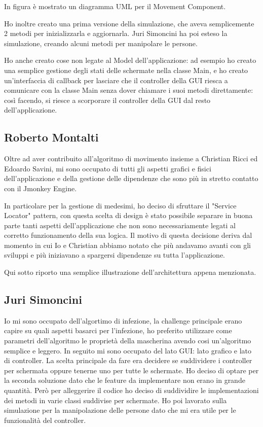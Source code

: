 In figura è mostrato un diagramma UML per il Movement Component.

Ho inoltre creato una prima versione della simulazione, che aveva semplicemente 2 metodi per inizializzarla e aggiornarla. Juri Simoncini ha poi esteso la simulazione, creando alcuni metodi per manipolare le persone.

Ho anche creato cose non legate al Model dell'applicazione: ad esempio ho creato una semplice gestione degli stati delle schermate nella classe Main, e ho creato un'interfaccia di callback per lasciare che il controller della GUI riesca a comunicare con la classe Main senza dover chiamare i suoi metodi direttamente: così facendo, si riesce a scorporare il controller della GUI dal resto dell'applicazione.

\subsection{Roberto Montalti}

Oltre ad aver contribuito all'algoritmo di movimento insieme a Christian Ricci ed Edoardo Savini, mi sono occupato di tutti gli aspetti grafici e fisici dell'applicazione e della gestione delle dipendenze che sono più in stretto contatto con il Jmonkey Engine.

In particolare per la gestione di medesimi, ho deciso di sfruttare il "Service Locator" pattern, con questa scelta di design è stato possibile separare in buona parte tanti aspetti dell'applicazione che non sono necessariamente legati al corretto funzionamento della sua logica.
Il motivo di questa decisione deriva dal momento in cui Io e Christian abbiamo notato che più andavamo avanti con gli sviluppi e più iniziavano a spargersi dipendenze su tutta l'applicazione.

Qui sotto riporto una semplice illustrazione dell'architettura appena menzionata.

\subsection{Juri Simoncini}
Io mi sono occupato dell'algortimo di infezione, la challenge principale erano capire su quali aspetti basarci per l'infezione, 
ho preferito utilizzare come parametri dell'algoritmo le proprietà della mascherina avendo cosi un'algoritmo semplice e leggero.
In seguito mi sono occupato del lato GUI: lato grafico e lato di controller.
La scelta principale da fare era decidere se suddividere i controller per schermata oppure tenerne uno per tutte le schermate.
Ho deciso di optare per la seconda soluzione dato che le feature da implementare non erano in grande quantità.
Però per alleggerire il codice ho deciso di suddividire le implementazioni dei metodi in varie classi suddivise per schermate.
Ho poi lavorato sulla simulazione per la manipolazione delle persone dato che mi era utile per le funzionalità del controller.

